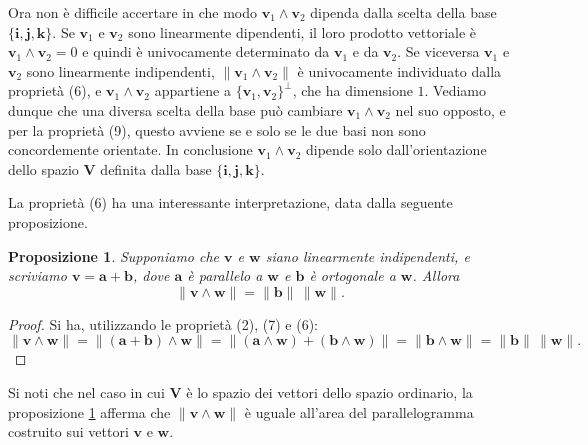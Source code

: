 \documentclass{article}
\theoremstyle{plain}
\newtheorem{prop}[thm]{Proposizione}
\theoremstyle{definition}
\theoremstyle{remark}
\begin{document}
Ora non è difficile accertare in che modo $\mathbf{v}_1 \wedge \mathbf{v}_2$ dipenda dalla scelta della base 
$\{\mathbf{i}, \mathbf{j}, \mathbf{k}\}$. Se $\mathbf{v}_1$ e $\mathbf{v}_2$ sono linearmente dipendenti, il 
loro prodotto vettoriale è $\mathbf{v}_1 \wedge \mathbf{v}_2 = 0$ e quindi è univocamente determinato da 
$\mathbf{v}_1$ e da $\mathbf{v}_2$. Se viceversa $\mathbf{v}_1$ e $\mathbf{v}_2$ sono linearmente indipendenti, 
$\|\mathbf{v}_1 \wedge \mathbf{v}_2\|$ è univocamente individuato dalla proprietà (6), e 
$\mathbf{v}_1 \wedge \mathbf{v}_2$ appartiene a $\{ \mathbf{v}_1, \mathbf{v}_2 \}^\perp$, che ha dimensione $1$. 
Vediamo dunque che una diversa scelta della base può cambiare $\mathbf{v}_1 \wedge \mathbf{v}_2$ nel suo opposto, 
e per la proprietà (9), questo avviene se e solo se le due basi non sono concordemente orientate. In conclusione 
$\mathbf{v}_1 \wedge \mathbf{v}_2$ dipende solo dall'orientazione dello spazio $\mathbf{V}$ definita dalla base $\{\mathbf{i}, \mathbf{j}, \mathbf{k}\}$.

\vspace{10pt}

La proprietà (6) ha una interessante interpretazione, data dalla seguente proposizione.

\vspace{10pt}

\begin{bxthm}
\begin{prop}\label{diciottoquattro}
Supponiamo che $\mathbf{v}$ e $\mathbf{w}$ siano linearmente indipendenti, e scriviamo $\mathbf{v} = \mathbf{a} + \mathbf{b}$, 
dove $\mathbf{a}$ è parallelo a $\mathbf{w}$ e $\mathbf{b}$ è ortogonale a $\mathbf{w}$. Allora
\[
\|\mathbf{v} \wedge \mathbf{w}\| = \|\mathbf{b}\| \, \|\mathbf{w}\|.
\]    
\end{prop}
\end{bxthm}
\begin{proof}
Si ha, utilizzando le proprietà (2), (7) e (6):
\[
\|\mathbf{v} \wedge \mathbf{w}\| = \|(\mathbf{a}+\mathbf{b}) \wedge \mathbf{w}\| = \| (\mathbf{a} \wedge \mathbf{w}) + (\mathbf{b} \wedge \mathbf{w}) \| = \| \mathbf{b} \wedge \mathbf{w}\| = \|\mathbf{b}\| \, \|\mathbf{w}\|.
\]    
\end{proof}

\vspace{10pt}

Si noti che nel caso in cui $\mathbf{V}$ è lo spazio dei vettori dello spazio ordinario, la proposizione \ref{diciottoquattro} 
afferma che $\|\mathbf{v} \wedge \mathbf{w}\|$ è uguale all'area del parallelogramma costruito sui vettori $\mathbf{v}$ e 
$\mathbf{w}$.
\end{document}
